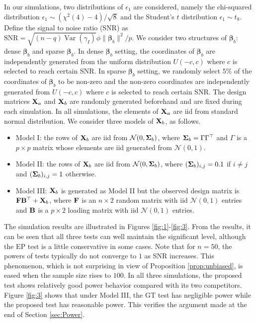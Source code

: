 \documentclass[11pt]{article}
\DeclareMathOperator{\myVar}{Var}
\newcommand{\bfsym}[1]{\ensuremath{\boldsymbol{#1}}}
\def\bbeta{\bfsym \beta}
\theoremstyle{plain}
\theoremstyle{definition}
\theoremstyle{remark}
\begin{document}
In our simulations, two distributions of $\epsilon_1$ are considered, namely the chi-squared distribution \mbox{$\epsilon_1 \sim (\chi^2(4)-4)/\sqrt 8$} and the Student's $t$ distribution $\epsilon_1 \sim t_8$.
Define the signal to noise ratio (SNR) as $\text{SNR}=\sqrt{(n-q)\myVar (\gamma_I)} \phi \|\bbeta_b\|^2/p$.
We consider two structures of $\bbeta_b$: dense $\bbeta_b$ and sparse $\bbeta_b$.
In dense $\bbeta_b$ setting, the coordinates of $\bbeta_b$ are independently generated from the uniform distribution $U(-c, c)$ where $c$ is selected to reach certain SNR.
In sparse $\bbeta_b$ setting, we randomly select $5\%$ of the coordinates of $\bbeta_b$ to be non-zero and the non-zero coordinates are independently generated from $U(-c,c)$ where $c$ is selected to reach certain SNR.
The design matrices $\mathbf{X}_a$ and $\mathbf{X}_b$ are randomly generated beforehand and are fixed during each simulation.
In all simulations, the elements of $\mathbf{X}_a$ are iid from standard normal distribution.
We consider three models of $\mathbf{X}_b$, as follows.
\begin{itemize}
    \item Model I: the rows of $\mathbf{X}_b$ are iid from $\mathcal N(0,\bSigma_b)$, where $\bSigma_b =\Gamma \Gamma^\top$ and $\Gamma$ is a $p\times p$ matrix whose elements are iid generated from $\mathcal N(0,1)$.
        \item
            Model II: the rows of $\mathbf{X}_b$ are iid from $\mathcal N(0,\bSigma_b)$, where $(\bSigma_b)_{i,j}=0.1$ if $i\neq j$ and $(\bSigma_b)_{i,j}=1$ otherwise.
        \item
            Model III: $\mathbf{X}_b$ is generated as Model II but the observed design matrix is $\mathbf{F}\mathbf{B}^\top+\mathbf{X}_b$, where $\mathbf{F}$ is an $n \times 2$ random matrix with iid $\mathcal N(0,1)$ entries and $\mathbf{B}$ is a $p \times 2$ loading matrix with iid $\mathcal N(0,1)$ entries.
\end{itemize}
The simulation results are illustrated in Figures \ref{fig:1}-\ref{fig:3}.
From the results, it can be seen that all three tests can well maintain the significant level, although the EP test is a little conservative in some cases.
Note that for $n =50$, the powers of tests typically do not converge to $1$ as SNR increases.
This phenomenon, which is not surprising in view of Proposition \ref{prop:unbiased}, is eased when the sample size rises to $100$.
In all three simulations, the proposed test shows relatively good power behavior compared with its two competitors.
Figure \ref{fig:3} shows that under Model III, the GT test has negligible power while the proposed test has reasonable power.
This verifies the argument made at the end of Section \ref{sec:Power}.
\end{document}
